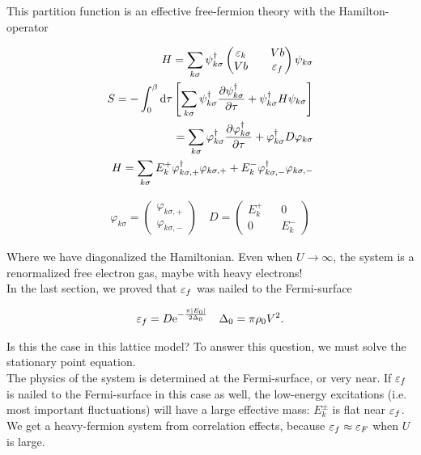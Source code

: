 This partition function is an effective free-fermion theory with the Hamilton-operator 

\begin{align*}
    H = \sum_{k\sigma} \psi_{k\sigma}^\dagger \begin{pmatrix} \varepsilon_k && Vb \\
    Vb && \varepsilon_f \end{pmatrix} \psi_{k\sigma} \\
    S = - \int_{0}^{\beta} \dd \tau \left[ \sum_{k\sigma} \psi_{k\sigma}^\dagger \pdv{\psi_{k\sigma}^\dagger}{\tau} + \psi_{k\sigma}^\dagger H \psi_{k\sigma} \right] \\ = \sum_{k\sigma} \varphi_{k\sigma}^\dagger \pdv{\varphi_{k\sigma}^\dagger}{\tau} + \varphi_{k\sigma}^\dagger D \varphi_{k\sigma} \\
    H = \sum_{k\sigma} E_k^+\varphi_{k\sigma, +}^{\dagger} \varphi_{k\sigma, +} + E_k^- \varphi_{k\sigma, -}^\dagger \varphi_{k\sigma, -} 
\end{align*}

\begin{align*}
    \varphi_{k\sigma} = \begin{pmatrix} \varphi_{k\sigma, +}  \\ \varphi_{k\sigma, -} \end{pmatrix} \quad D = \begin{pmatrix} E_k^+ && 0 \\ 0 && E_k^- \end{pmatrix} 
\end{align*}

Where we have diagonalized the Hamiltonian. Even when $U \to \infty$, the system is a renormalized free electron gas, maybe with heavy electrons! \\ 

In the last section, we proved that $\varepsilon_f$ was nailed to the Fermi-surface

\begin{align*}
    \varepsilon_f = D \mathrm{e}^{-\frac{\pi \abs{E_0}}{2\Delta_0}} \quad \Delta_0 = \pi \rho_0 V^2. 
\end{align*}

Is this the case in this lattice model? To answer this question, we must solve the stationary point equation. \\

The physics of the system is determined at the Fermi-surface, or very near. If $\varepsilon_f$ is nailed to the Fermi-surface in this case as well, the low-energy excitations (i.e. most important fluctuations) will have a large effective mass: $E_k^\pm$ is flat near $\varepsilon_f$. We get a heavy-fermion system from correlation effects, because $\varepsilon_f \approx \varepsilon_F$ when $U$ is large. \\

